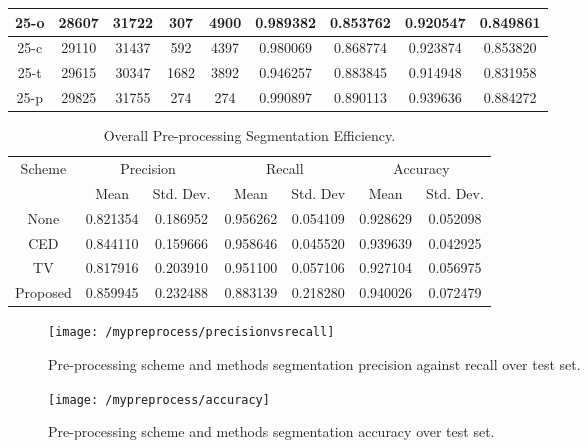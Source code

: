 \begin{longtable}[!h]{|c|c|c|c|c|c|c|c|c|}
	\hline	25-o	&	28607	&	31722	&	307	&	4900	&	0.989382	&	0.853762	&	0.920547	&	0.849861	\\
	\hline	25-c	&	29110	&	31437	&	592	&	4397	&	0.980069	&	0.868774	&	0.923874	&	0.853820	\\
	\hline	\rowcolor{bad}25-t	&	29615	&	30347	&	1682	&	3892	&	0.946257	&	0.883845	&	0.914948	&	0.831958	\\
	\hline	\rowcolor{closest} 25-p	&	29825	&	31755	&	274	&	274	&	0.990897	&	0.890113	&	0.939636	&	0.884272\\
	\hline
\end{longtable}

\begin{longtable}[!h]{|c|c|c|c|c|c|c|}
	\caption{Overall Pre-processing Segmentation Efficiency.} \label{tab:overallpreprocessingsegmentationefficiency}\\
	\hline 
	\multirow{2}{*}{Scheme} & \multicolumn{2}{c|}{Precision} & \multicolumn{2}{c|}{Recall} & \multicolumn{2}{c|}{Accuracy} \\ 
	\hhline{~------}
	& Mean & Std. Dev. & Mean & Std. Dev & Mean & Std. Dev.  \\ 
	\hline	None	&	0.821354	&	0.186952	&	0.956262	&	0.054109	&	0.928629	&	0.052098	\\
	\hline	CED	&	0.844110	&	0.159666	&	0.958646	&	0.045520	&	0.939639	&	0.042925	\\
	\hline	\rowcolor{bad} TV	&	0.817916	&	0.203910	&	0.951100	&	0.057106	&	0.927104	&	0.056975	\\
	\hline	\rowcolor{closest} Proposed	&	0.859945	&	0.232488	&	0.883139	&	0.218280	&	0.940026	&	0.072479	\\
	
	\hline
\end{longtable}

\begin{figure}[!h]
	\centering
	\texttt{[image: /mypreprocess/precisionvsrecall]}
	\caption{Pre-processing scheme and methods segmentation precision against recall over test set.}
	\label{fig:proposedschemeprecisionvsrecall}
\end{figure}

\begin{figure}[!h]
	\centering
	\texttt{[image: /mypreprocess/accuracy]}
	\caption{Pre-processing scheme and methods segmentation accuracy over test set.}
	\label{fig:proposedschemeaccuracy}
\end{figure}


